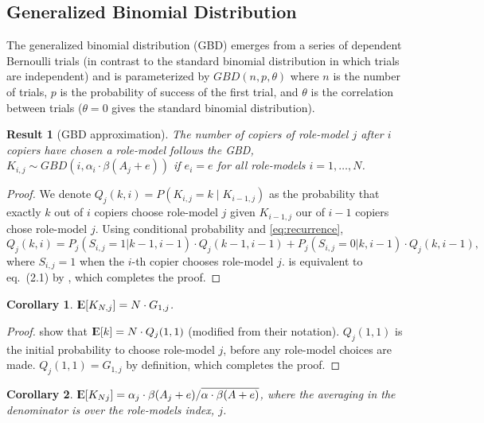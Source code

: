 \documentclass[12pt]{extarticle}
\DeclareMathOperator*{\E}{{\rm I\kern-.3em E}}
\newtheorem{corollary}{Corollary}
\newtheorem{result}{Result}
\begin{document}
\subsection*{Generalized Binomial Distribution}
The generalized binomial distribution (GBD) emerges from a series of dependent Bernoulli trials (in contrast to the standard binomial distribution in which trials are independent) and is parameterized by $GBD(n, p, \theta)$ where $n$ is the number of trials, $p$ is the probability of success of the first trial, and $\theta$ is the correlation between trials ($\theta=0$ gives the standard binomial distribution).

\begin{result}[GBD approximation]
The number of copiers of role-model $j$ after $i$ copiers have chosen a role-model follows the GBD, $K_{i,j} \sim GBD(i,\alpha_i\cdot\beta(A_j+e))$ if $e_i=e$ for all role-models $i=1, \ldots, N$. 
\end{result}

\begin{proof}
We denote $Q_j(k,i)=P(K_{i,j} = k \mid K_{i-1,j})$ as the probability that exactly $k$ out of $i$ copiers choose role-model $j$ given $K_{i-1,j}$ our of $i-1$ copiers chose role-model $j$. 
Using conditional probability and \cref{eq:recurrence},
\begin{equation}\label{recursive}
Q_j(k,i) = P_j(S_{i,j}=1 | k-1,i-1) \cdot Q_j(k-1,i-1) + P_j(S_{i,j} =0 | k,i-1) \cdot Q_j(k,i-1),
\end{equation}
where $S_{i,j} =1 $ when the $i$-th copier chooses role-model $j$.
 is equivalent to eq.~(2.1) by \citet{GBD}, which completes the proof.
\end{proof}

\begin{corollary}
$\E[K_{N,j}] = N \cdot G_{1,j}$.
\end{corollary}

\begin{proof}
\citet[eq.~(2.3)]{GBD} show that 
$\E[k] = N \cdot Q_j(1,1)$ (modified from their notation).
$Q_j(1,1)$ is the initial probability to choose role-model $j$, before any role-model choices are made.
$Q_j(1,1) = G_{1,j}$ by definition, which completes the proof.
\end{proof}

\begin{corollary}
$\E[K_{Nj}] = \alpha_j \cdot \beta(A_j+e) / \overline{\alpha \cdot \beta(A+e)}$, where the averaging in the denominator is over the role-models index, $j$.
\end{corollary}
\end{document}
